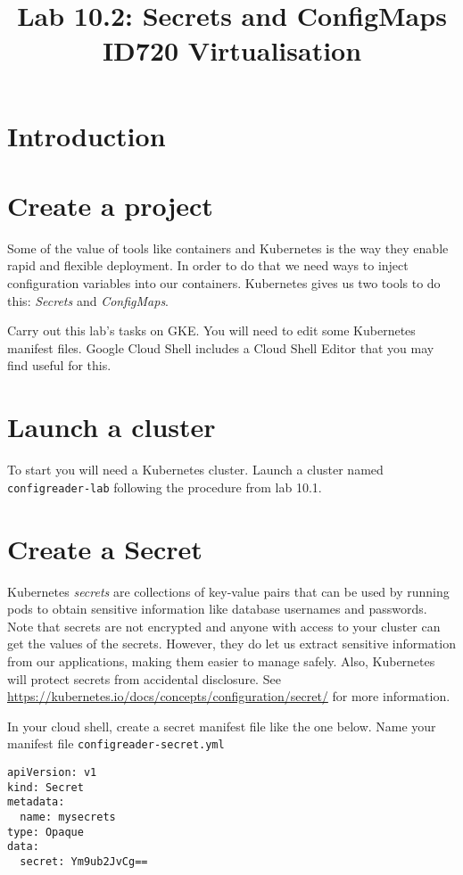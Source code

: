 \documentclass{article}
\begin{document}
\title{Lab 10.2: Secrets and ConfigMaps\\ID720 Virtualisation}
\date{}
\maketitle

\section*{Introduction}


\section{Create a project}
Some of the value of tools like containers and Kubernetes is the way they enable rapid and flexible deployment. In order to do that we need ways to inject configuration variables into our containers. Kubernetes gives us two tools to do this: \emph{Secrets} and \emph{ConfigMaps}.

Carry out this lab's tasks on GKE. You will need to edit some Kubernetes manifest files. Google Cloud Shell includes a Cloud Shell Editor that you may find useful for this.

\section{Launch a cluster}
To start you will need a Kubernetes cluster. Launch a cluster named \texttt{configreader-lab} following the procedure from lab 10.1.

\section{Create a Secret}
Kubernetes \emph{secrets} are collections of key-value pairs that can be used by running pods to obtain sensitive information like database usernames and passwords. Note that secrets are not encrypted and anyone with access to your cluster can get the values of the secrets. However, they do let us extract sensitive information from our applications, making them easier to manage safely. Also, Kubernetes will protect secrets from accidental disclosure. See \url{https://kubernetes.io/docs/concepts/configuration/secret/} for more information.

In your cloud shell, create a secret manifest file like the one below.
Name your manifest file \texttt{configreader-secret.yml}

\begin{verbatim}
apiVersion: v1
kind: Secret
metadata:
  name: mysecrets 
type: Opaque
data:
  secret: Ym9ub2JvCg==
\end{verbatim}
\end{document}
